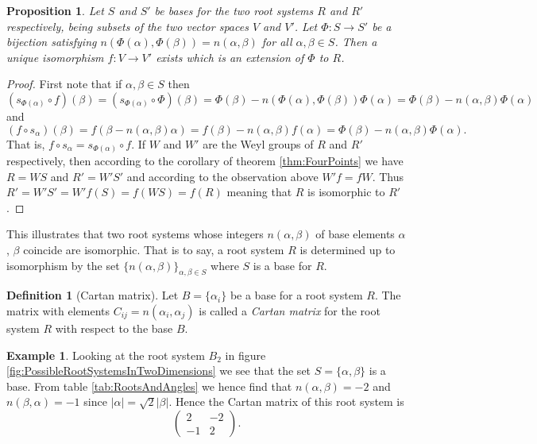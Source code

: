 \documentclass[twoside,utf8]{article}
\theoremstyle{plain}
\newtheorem{proposition}{Proposition}
\theoremstyle{definition}
\newtheorem{definition}{Definition}
\newtheorem*{example}{Example}
\theoremstyle{remark}
\begin{document}
\begin{proposition}
Let $S$ and $S'$ be bases for the two root systems $R$ and $R'$ respectively, being subsets of the two vector spaces $V$ and $V'$. Let $\Phi: S \rightarrow S'$ be a bijection satisfying $n(\Phi(\alpha),\Phi(\beta))=n(\alpha,\beta)$ for all $\alpha,\beta \in S$. Then a unique isomorphism $f: V \rightarrow V'$ exists which is an extension of $\Phi$ to $R$.
\end{proposition}
\begin{proof}
First note that if $\alpha,\beta \in S$ then
\[
\left( s_{\Phi(\alpha)} \circ f \right)(\beta) 
= (s_{\Phi(\alpha)} \circ \Phi )(\beta)
= \Phi (\beta)-n\left({\Phi(\alpha)}, \Phi (\beta)\right){\Phi(\alpha)}
= \Phi (\beta)-n\left(\alpha,\beta\right){\Phi(\alpha)}
\]
and
\[
\left( f \circ s_{\alpha} \right) (\beta) 
= f\left(  \beta - n(\alpha, \beta )\alpha \right) 
= f(\beta) - n(\alpha, \beta )f(\alpha)
= \Phi(\beta) - n(\alpha, \beta )\Phi(\alpha).
\]
That is, $f \circ s_{\alpha} = s_{\Phi(\alpha)} \circ f $. If $W$ and $W'$ are the Weyl groups of $R$ and $R'$ respectively, then according to the corollary of theorem \ref*{thm:FourPoints} we have $R=WS$ and $R'=W'S'$ and according to the observation above $W'f=fW$. Thus $R' = W'S' = W'f(S) = f(WS) = f(R)$ meaning that $R$ is isomorphic to $R'$.
\end{proof}

\noindent
This illustrates that two root systems whose integers $n(\alpha,\beta)$ of base elements $\alpha$, $\beta$ coincide are isomorphic. That is to say, a root system $R$ is determined up to isomorphism by the set $\{n(\alpha,\beta)\}_{\alpha,\beta\in S}$ where $S$ is a base for $R$.

\begin{definition}[Cartan matrix]
Let $B=\{\alpha_i\}$ be a base for a root system $R$. The matrix with elements $C_{ij}=n(\alpha_i,\alpha_j)$ is called a \textit{Cartan matrix} for the root system $R$ with respect to the base $B$.
\end{definition}

\begin{example}
Looking at the root system $B_2$ in figure \ref*{fig:PossibleRootSystemsInTwoDimensions} we see that the set $S=\{\alpha,\beta\}$ is a base. From table \ref*{tab:RootsAndAngles} we hence find that $n(\alpha,\beta)=-2$ and $n(\beta,\alpha)=-1$ since $|\alpha|=\sqrt{2}|\beta|$. Hence the Cartan matrix of this root system is 
\[
\left(\begin{matrix}
2  & -2 \\
-1 & 2
\end{matrix}\right).
\]
\end{example}
\end{document}
